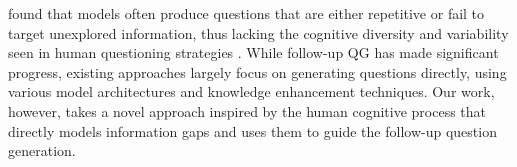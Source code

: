  found that models often produce questions that are either repetitive or fail to target unexplored information, thus lacking the cognitive diversity and variability seen in human questioning strategies \cite{sultan-etal-2020-importance}. While follow-up QG has made significant progress, existing approaches largely focus on generating questions directly, using various model architectures and knowledge enhancement techniques. Our work, however, takes a novel approach inspired by the human cognitive process that directly models information gaps and uses them to guide the follow-up question generation. 
